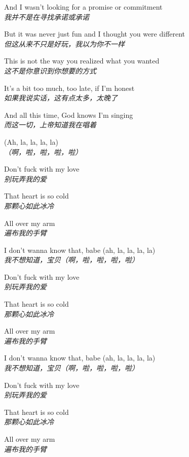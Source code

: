 \begin{spacing}{1.5}
\begin{flushleft}
And I wasn't looking for a promise or commitment\\
\textit{我并不是在寻找承诺或承诺}\lyricspace

But it was never just fun and I thought you were different\\
\textit{但这从来不只是好玩，我以为你不一样}\lyricspace

This is not the way you realized what you wanted\\
\textit{这不是你意识到你想要的方式}\lyricspace

It's a bit too much, too late, if I'm honest\\
\textit{如果我说实话，这有点太多，太晚了}\lyricspace

And all this time, God knows I'm singing\\
\textit{而这一切，上帝知道我在唱着}\lyricspace

(Ah, la, la, la, la)\\
\textit{（啊，啦，啦，啦，啦）}\lyricspace

Don't fuck with my love\\
\textit{别玩弄我的爱}\lyricspace

That heart is so cold\\
\textit{那颗心如此冰冷}\lyricspace

All over my arm\\
\textit{遍布我的手臂}\lyricspace

I don't wanna know that, babe (ah, la, la, la, la)\\
\textit{我不想知道，宝贝（啊，啦，啦，啦，啦）}\lyricspace

Don't fuck with my love\\
\textit{别玩弄我的爱}\lyricspace

That heart is so cold\\
\textit{那颗心如此冰冷}\lyricspace

All over my arm\\
\textit{遍布我的手臂}\lyricspace

I don't wanna know that, babe (ah, la, la, la, la)\\
\textit{我不想知道，宝贝（啊，啦，啦，啦，啦）}\lyricspace

Don't fuck with my love\\
\textit{别玩弄我的爱}\lyricspace

That heart is so cold\\
\textit{那颗心如此冰冷}\lyricspace

All over my arm\\
\textit{遍布我的手臂}\lyricspace


\end{flushleft}
\end{spacing}
